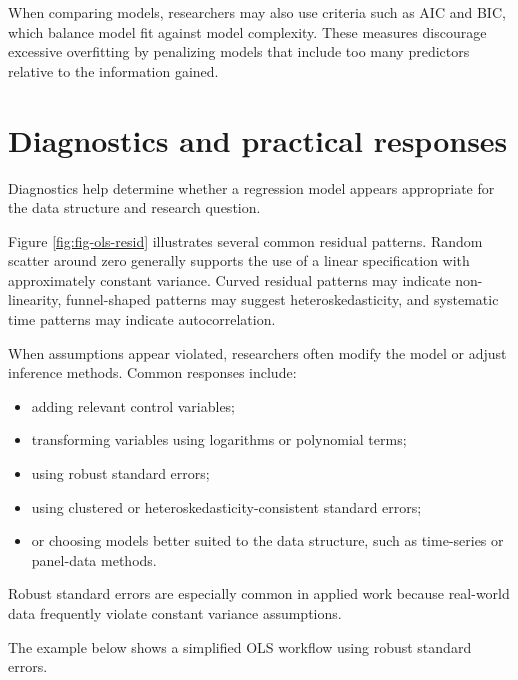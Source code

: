 \documentclass[
  11pt,
  oneside]{book}
\providecommand{\tightlist}{%
  \setlength{\itemsep}{0pt}\setlength{\parskip}{0pt}}
\begin{document}
When comparing models, researchers may also use criteria such as AIC and BIC, which balance model fit against model complexity. These measures discourage excessive overfitting by penalizing models that include too many predictors relative to the information gained.

\section{Diagnostics and practical responses}\label{diagnostics-and-practical-responses}

Diagnostics help determine whether a regression model appears appropriate for the data structure and research question.

Figure \ref{fig:fig-ols-resid} illustrates several common residual patterns. Random scatter around zero generally supports the use of a linear specification with approximately constant variance. Curved residual patterns may indicate non-linearity, funnel-shaped patterns may suggest heteroskedasticity, and systematic time patterns may indicate autocorrelation.

When assumptions appear violated, researchers often modify the model or adjust inference methods. Common responses include:

\begin{itemize}
\tightlist
\item
  adding relevant control variables;
\item
  transforming variables using logarithms or polynomial terms;
\item
  using robust standard errors;
\item
  using clustered or heteroskedasticity-consistent standard errors;
\item
  or choosing models better suited to the data structure, such as time-series or panel-data methods.
\end{itemize}

Robust standard errors are especially common in applied work because real-world data frequently violate constant variance assumptions.

The example below shows a simplified OLS workflow using robust standard errors.
\end{document}

